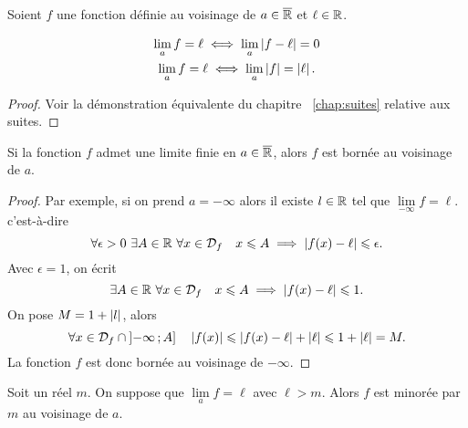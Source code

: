 Soient \(f\) une fonction définie au voisinage de \(a \in \overline{\mathbb{R}}\) et \(\ell \in \mathbb{R}\).
\begin{prop}
  \begin{gather}
    \lim\limits_{a} f = \ell \iff \lim\limits_{a} \left\lvert f-\ell\right\rvert = 0 \\ 
    \lim\limits_{a} f = \ell \iff \lim\limits_{a} \left\lvert f\right\rvert=\left\lvert\ell\right\rvert.
  \end{gather}
\end{prop}
\begin{proof}
  Voir la démonstration équivalente du chapitre~
\ref{chap:suites} relative aux suites.
\end{proof}
\begin{prop}
  Si la fonction \(f\) admet une limite finie en \(a \in \overline{\mathbb{R}}\), alors \(f\) est bornée au voisinage de \(a\).
\end{prop}
\begin{proof}
  Par exemple, si on prend \(a=-\infty\) alors il existe \(l \in \mathbb{R}\) tel que \(\lim\limits_{-\infty} f = \ell\). c'est-à-dire
  \begin{equation}
    \forall \epsilon >0 \ \exists A \in \R \ \forall x \in \Def{f} \quad x \leqslant A \implies \abs{f(x)-\ell} \leqslant \epsilon.
  \end{equation}
  Avec \(\epsilon=1\), on écrit
  \begin{equation}
    \exists A \in \mathbb{R} \ \forall x \in \mathcal{D}_{f} \quad x \leqslant A \implies \left\lvert f(x)-\ell\right\rvert \leqslant 1.
  \end{equation}
  On pose \(M=1+\left\lvert l\right\rvert\), alors
  \begin{equation}
    \forall x \in \mathcal{D}_{f} \cap \left] -\infty \, ;  A \right] \quad \left\lvert f(x)\right\rvert \leqslant \left\lvert f(x)-\ell\right\rvert+\left\lvert\ell\right\rvert \leqslant 1+\left\lvert\ell\right\rvert=M.
  \end{equation}
  La fonction \(f\) est donc bornée au voisinage de \(-\infty\).
\end{proof}
\begin{prop}
  Soit un réel \(m\). On suppose que \(\lim\limits_{a} f=\ell\) avec \(\ell>m\). Alors \(f\) est minorée par \(m\) au voisinage de \(a\).
\end{prop}
